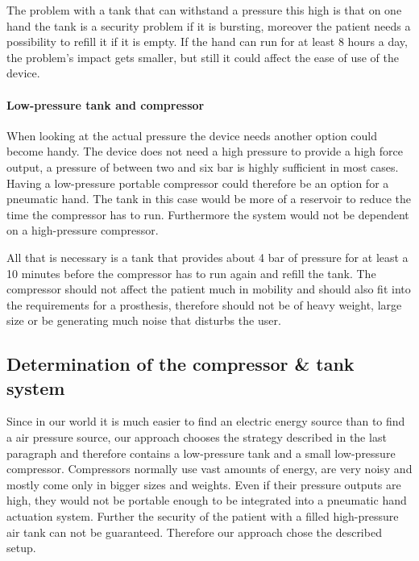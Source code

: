 \documentclass[main]{subfiles}
\begin{document}
The problem with a tank that can withstand a pressure this high is that on one hand the tank is a security problem if it is bursting, moreover the patient needs a possibility to refill it if it is empty. If the hand can run for at least 8 hours a day, the problem's impact gets smaller, but still it could affect the ease of use of the device.

\paragraph{Low-pressure tank and compressor}

When looking at the actual pressure the device needs another option could become handy. The device does not need a high pressure to provide a high force output, a pressure of between two and six bar is highly sufficient in most cases. Having a low-pressure portable compressor could therefore be an option for a pneumatic hand. The tank in this case would be more of a reservoir to reduce the time the compressor has to run. Furthermore the system would not be dependent on a high-pressure compressor.

All that is necessary is a tank that provides about 4 bar of pressure for at least a 10 minutes before the compressor has to run again and refill the tank. The compressor should not affect the patient much in mobility and should also fit into the requirements for a prosthesis, therefore should not be of heavy weight, large size or be generating much noise that disturbs the user.


\subsection{Determination of the compressor \& tank system}

Since in our world it is much easier to find an electric energy source than to find a air pressure source, our approach chooses the strategy described in the last paragraph and therefore contains a low-pressure tank and a small low-pressure compressor. Compressors normally use vast amounts of energy, are very noisy and mostly come only in bigger sizes and weights. Even if their pressure outputs are high, they would not be portable enough to be integrated into a pneumatic hand actuation system. Further the security of the patient with a filled high-pressure air tank can not be guaranteed. Therefore our approach chose the described setup.
\end{document}
